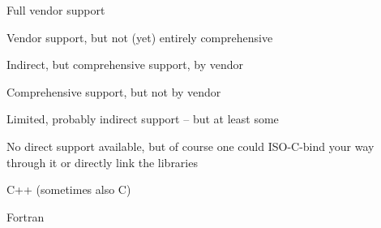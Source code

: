 \begin{frame}
\vspace*{-1\baselineskip}
\begin{multicols}{3}
    \begin{description}[Fortran]
    \ifdefined\tightlist\tightlist\fi%
        \item[\fullok] Full vendor support
        \item[\prettyok] Vendor support, but not (yet) entirely comprehensive
        \item[\indirectok] Indirect, but comprehensive support, by vendor
        \item[\nonvendorok] Comprehensive support, but not by vendor
        \item[\somesupport] Limited, probably indirect support -- but at least some
        \item[\nope] No direct support available, but of course one could ISO-C-bind your way through it or directly link the libraries
        \item[\C] C++ (sometimes also C)
        \item[\F] Fortran
        \end{description}
\end{multicols}


\end{frame}
